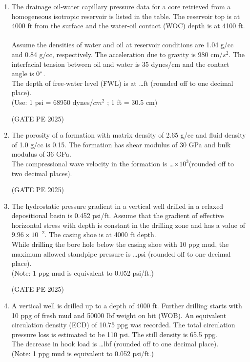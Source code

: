 \documentclass[journal,12pt,onecolumn]{IEEEtran}
\theoremstyle{remark}
\begin{document}
\begin{enumerate}
\item The drainage oil-water capillary pressure data for a core retrieved from a homogeneous isotropic reservoir is listed in the table. The reservoir top is at 4000 ft from the surface and the water-oil contact (WOC) depth is at 4100 ft.\\
\\
Assume the densities of water and oil at reservoir conditions are 1.04 g/cc and 0.84 g/cc, respectively. The acceleration due to gravity is 980 cm/$s^2$. The interfacial tension between oil and water is 35 dynes/cm and the contact angle is $0\degree$.\\
The depth of free-water level (FWL) is at \dots ft (rounded off to one decimal place).\\
(Use: 1 psi = 68950 dynes/$cm^2$ ; 1 ft = 30.5 cm)

\hfill{(GATE PE 2025)}

\item The porosity of a formation with matrix density of 2.65 g/cc and fluid density of 1.0 g/cc is 0.15. The formation has shear modulus of 30 GPa and bulk modulus of 36 GPa.\\
The compressional wave velocity in the formation is \dots$\times 10^3$(rounded off to two decimal places).

\hfill{(GATE PE 2025)}

\item The hydrostatic pressure gradient in a vertical well drilled in a relaxed depositional basin is 0.452 psi/ft. Assume that the gradient of effective horizontal stress with depth is constant in the drilling zone and has a value of $9.96\times 10^{-2}$. The casing shoe is at 4000 ft depth.\\
While drilling the bore hole below the casing shoe with 10 ppg mud, the maximum allowed standpipe pressure is \dots psi (rounded off to one decimal place).\\
(Note: 1 ppg mud is equivalent to 0.052 psi/ft.)

\hfill{(GATE PE 2025)}


\item A vertical well is drilled up to a depth of 4000 ft. Further drilling starts with 10 ppg of fresh mud and 50000 lbf weight on bit (WOB). An equivalent circulation density (ECD) of 10.75 ppg was recorded. The total circulation pressure loss is estimated to be 110 psi. The still density is 65.5 ppg.\\
The decrease in hook load is \dots lbf (rounded off to one decimal place).\\
(Note: 1 ppg mud is equivalent to 0.052 psi/ft.)


\end{enumerate}
\end{document}
